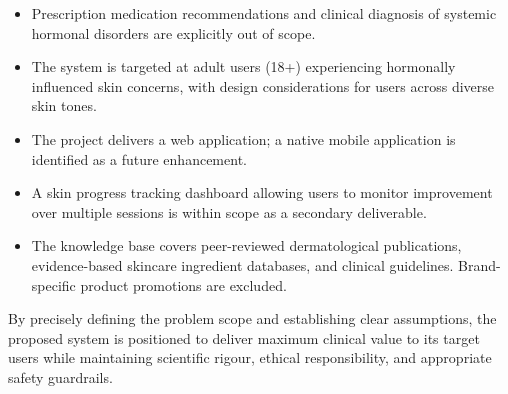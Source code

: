 \begin{itemize}
\begin{itemize}[label=$\diamond$]
                \item Prescription medication recommendations and clinical diagnosis of systemic hormonal disorders are explicitly out of scope.

                \item The system is targeted at adult users (18+) experiencing hormonally influenced skin concerns, with design considerations for users across diverse skin tones.

                \item The project delivers a web application; a native mobile application is identified as a future enhancement.

                \item A skin progress tracking dashboard allowing users to monitor improvement over multiple sessions is within scope as a secondary deliverable.

                \item The knowledge base covers peer-reviewed dermatological publications, evidence-based skincare ingredient databases, and clinical guidelines. Brand-specific product promotions are excluded.
            \end{itemize}
    \end{itemize}
    \vspace{0.5cm}
\hspace*{0.5in}By precisely defining the problem scope and establishing clear assumptions, the proposed system is positioned to deliver maximum clinical value to its target users while maintaining scientific rigour, ethical responsibility, and appropriate safety guardrails.
